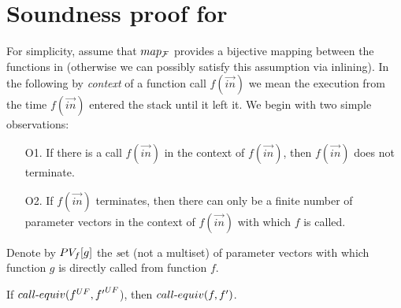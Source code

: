 \newpage
\section{Soundness proof for \mtermdp}
\label{sec:proof1}

For simplicity, assume that $map_{\cal F}$ provides a bijective mapping between the
functions in  (otherwise we can possibly satisfy this assumption via
inlining).
%
In the following by \emph{context} of a function call $f(\vec{in})$ we mean the execution from the time $f(\vec{in})$ entered the stack until it left it. We begin with two simple observations:
\begin{itemize}
\item[O1.] If there is a call $f(\vec{in})$ in the context of
    $f(\vec{in})$, then $f(\vec{in})$ does not terminate.

\item[O2.] If $f(\vec{in})$ terminates, then there can only be a
    finite number of parameter vectors in the context of $f(\vec{in})$ with which $f$ is called.
\end{itemize}
%
Denote by $PV_f[g]$ the {\emph set} (not a multiset) of parameter vectors
with which function $g$ is directly called from function $f$.

\begin{lemma}\label{lem:a1l1}
If $call\mbox{-}equiv({f}^{UF},{f'}^{UF}$), then $call\mbox{-}equiv(f,f')$.
\end{lemma}

